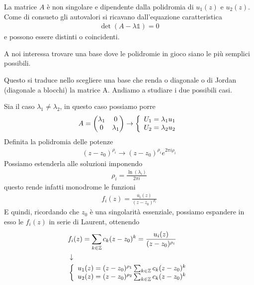 La matrice $A$ è non singolare e dipendente dalla polidromia di $u_1(z)$ e $u_2(z)$. Come di consueto gli autovalori si ricavano dall'equazione caratteristica
\begin{align}
	\det(A -\lambda \mathbb{1}) = 0
\end{align}
e possono essere distinti o coincidenti.

A noi interessa trovare una base dove le polidromie in gioco siano le più semplici possibili. 

Questo si traduce nello scegliere una base che renda o diagonale o di Jordan (diagonale a blocchi) la matrice A. Andiamo a studiare i due possibili casi.

Sia il caso $\lambda_1 \neq \lambda_2$, in questo caso possiamo porre
\begin{align}
	A = \begin{pmatrix}
		\lambda_1 & 0 \\
		0 & \lambda_1 
		\end{pmatrix} \to \left\{ \begin{array}{cc} U_1 = \lambda_1 u_1\\ U_2 = \lambda_2 u_2 \end{array} \right.
\end{align}	
Definita la polidromia delle potenze
\begin{align}
	(z-z_0)^{\rho_i} \to (z-z_0)^{\rho_i} e^{2\pi i \rho_i} 
\end{align}
Possiamo estenderla alle soluzioni imponendo
\begin{align}
	\rho_i = \frac{\ln(\lambda_i)}{2\pi i}
\end{align}
questo rende infatti monodrome le funzioni
\begin{align}
	f_i(z) = \frac{u_i(z)}{(z-z_0)^{\rho_i}}
\end{align}
E quindi, ricordando che $z_0$ è una singolarità essenziale, possiamo espandere in esso le $f_i(z)$ in serie di Laurent, ottenendo
\begin{align}
	&f_i(z) = \sum_{k\in \mathbb{Z}} c_k (z-z_0)^k = \frac{u_i(z)}{(z-z_0)^{\rho_i}}\\ &\downarrow \nonumber \\
	&\left\{ \begin{array}{cc} u_1(z) = (z-z_0)^{\rho_1}\sum_{k\in \mathbb{Z}} c_k (z-z_0)^k\\ u_2(z) = (z-z_0)^{\rho_2}\sum_{k\in \mathbb{Z}} c_k (z-z_0)^k \end{array} \right.
\end{align}

\newpage

